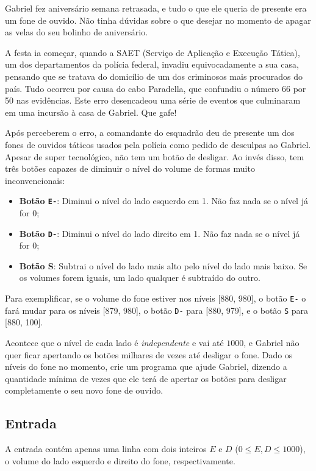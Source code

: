 Gabriel fez aniversário semana retrasada, e tudo o que ele queria de presente era um fone de ouvido. Não tinha dúvidas sobre o que desejar no momento de apagar as velas do seu bolinho de aniversário. 

A festa ia começar, quando a SAET (Serviço de Aplicação e Execução Tática), um dos departamentos da polícia federal, invadiu equivocadamente a sua casa, pensando que se tratava do domicílio de um dos criminosos mais procurados do país. Tudo ocorreu por causa do cabo Paradella, que confundiu o número 66 por 50 nas evidências. Este erro desencadeou uma série de eventos que culminaram em uma incursão à casa de Gabriel. Que gafe!

Após perceberem o erro, a comandante do esquadrão deu de presente um dos fones de ouvidos táticos usados pela polícia como pedido de desculpas ao Gabriel. Apesar de super tecnológico, não tem um botão de desligar. Ao invés disso, tem três botões capazes de diminuir o nível do volume de formas muito inconvencionais:

\begin{itemize}
\item \textbf{Botão \texttt{E-}}: Diminui o nível do lado esquerdo em 1. Não faz nada se o nível já for 0;
\item \textbf{Botão \texttt{D-}}: Diminui o nível do lado direito em 1. Não faz nada se o nível já for 0;
\item \textbf{Botão S}: Subtrai o nível do lado mais alto pelo nível do lado mais baixo. Se os volumes forem iguais, um lado qualquer é subtraído do outro.
\end{itemize}

Para exemplificar, se o volume do fone estiver nos níveis [880, 980], o botão \texttt{E-} o fará mudar para os níveis [879, 980], o botão \texttt{D-} para [880, 979], e o botão \texttt{S} para [880, 100].

Acontece que o nível de cada lado é \textit{independente} e vai até $1000$, e Gabriel não quer ficar apertando os botões milhares de vezes até desligar o fone. Dado os níveis do fone no momento, crie um programa que ajude Gabriel, dizendo a quantidade mínima de vezes que ele terá de apertar os botões para desligar completamente o seu novo fone de ouvido.

\subsection*{Entrada}
A entrada contém apenas uma linha com dois inteiros $E$ e $D$ ($0 \leq E, D \leq 1000$), o volume do lado esquerdo e direito do fone, respectivamente.

